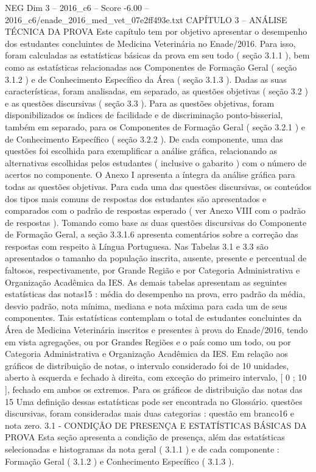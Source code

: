 \begin{textsample}{NEG Dim 3 – 2016\_c6 – Score -6.00 – 2016\_c6/enade\_2016\_med\_vet\_07e2ff493e.txt}  \label{ex:f3_neg_030}
CAPÍTULO 3 – ANÁLISE TÉCNICA DA PROVA Este capítulo tem por objetivo apresentar o desempenho dos estudantes concluintes de Medicina Veterinária no Enade/2016.
Para isso, foram calculadas as estatísticas básicas da prova em seu todo ( seção 3.1.1 ), bem como as estatísticas relacionadas aos Componentes de Formação Geral ( seção 3.1.2 ) e de Conhecimento Específico da Área ( seção 3.1.3 ).
Dadas as suas características, foram analisadas, em separado, as questões objetivas ( seção 3.2 ) e as questões discursivas ( seção 3.3 ).
Para as questões objetivas, foram disponibilizados os índices de facilidade e de discriminação ponto-bisserial, também em separado, para os Componentes de Formação Geral ( seção 3.2.1 ) e de Conhecimento Específico ( seção 3.2.2 ).
De cada componente, uma das questões foi escolhida para exemplificar a análise gráfica, relacionando as alternativas escolhidas pelos estudantes ( inclusive o gabarito ) com o número de acertos no componente.
O Anexo I apresenta a íntegra da análise gráfica para todas as questões objetivas.
Para cada uma das questões discursivas, os conteúdos dos tipos mais comuns de respostas dos estudantes são apresentados e comparados com o padrão de respostas esperado ( ver Anexo VIII com o padrão de respostas ).
Tomando como base as duas questões discursivas do Componente de Formação Geral, a seção 3.3.1.6 apresenta comentários sobre a correção das respostas com respeito à Língua Portuguesa.
Nas Tabelas 3.1 e 3.3 são apresentados o tamanho da população inscrita, ausente, presente e percentual de faltosos, respectivamente, por Grande Região e por Categoria Administrativa e Organização Acadêmica da IES.
As demais tabelas apresentam as seguintes estatísticas das notas15 : média do desempenho na prova, erro padrão da média, desvio padrão, nota mínima, mediana e nota máxima para cada um de seus componentes.
Tais estatísticas contemplam o total de estudantes concluintes da Área de Medicina Veterinária inscritos e presentes à prova do Enade/2016, tendo em vista agregações, ou por Grandes Regiões e o país como um todo, ou por Categoria Administrativa e Organização Acadêmica da IES.
Em relação aos gráficos de distribuição de notas, o intervalo considerado foi de 10 unidades, aberto à esquerda e fechado à direita, com exceção do primeiro intervalo, [ 0 ; 10 ], fechado em ambos os extremos.
Para os gráficos de distribuição das notas das 15 Uma definição dessas estatísticas pode ser encontrada no Glossário. questões discursivas, foram consideradas mais duas categorias : questão em branco16 e nota zero. 3.1 - CONDIÇÃO DE PRESENÇA E ESTATÍSTICAS BÁSICAS DA PROVA Esta seção apresenta a condição de presença, além das estatísticas selecionadas e histogramas da nota geral ( 3.1.1 ) e de cada componente : Formação Geral ( 3.1.2 ) e Conhecimento Específico ( 3.1.3 ).

\end{textsample}
